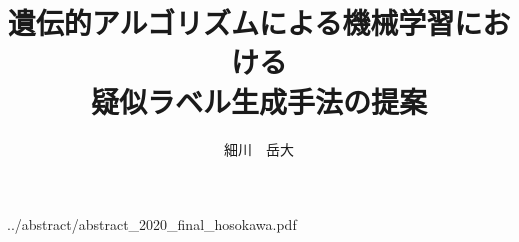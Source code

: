 \documentclass[12pt,dvipdfmx]{jarticle}
\title{遺伝的アルゴリズムによる機械学習における\\疑似ラベル生成手法の提案}
\author{細川　岳大}
\begin{document}
	\maketitle
	
	
	{../abstract/abstract_2020_final_hosokawa.pdf}
	\tableofcontents
	\newpage
	\listoffigures
	\newpage
	
	\listoftables
	\newpage
	
	
	
	\clearpage
	
	\clearpage
	
	
	\clearpage
	
	
	\clearpage
	
	
	\clearpage
	
	
	
	\clearpage
	
	
	
	
	
\end{document}
